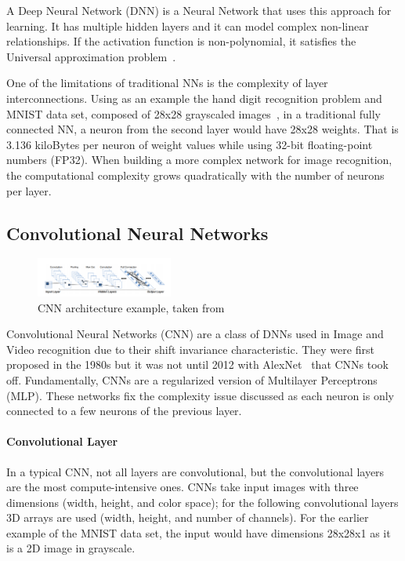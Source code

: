 \documentclass[conference]{IEEEtran}
\begin{document}
A Deep Neural Network (DNN) is a Neural Network that uses this approach for
learning. It has multiple hidden layers and it can model complex non-linear
relationships. If the activation function is non-polynomial, it satisfies the
Universal approximation problem~\cite{approximation:problem}.

One of the limitations of traditional NNs is the complexity of layer
interconnections. Using as an example the hand digit recognition problem and MNIST
data set, composed of 28x28 grayscaled images~\cite{mnist:digits}, in a
traditional fully connected NN, a neuron from the second layer would have 28x28
weights. That is 3.136 kiloBytes per neuron of weight values while using 32-bit
floating-point numbers (FP32). When building a more complex network for image
recognition, the computational complexity grows quadratically with the number
of neurons per layer.


\subsection{Convolutional Neural Networks}
\label{section:cnn}

 \begin{figure}[!htb]
    \centering
    \includegraphics[width=0.4\textwidth]{Figures/convolutionlayer.png}
    \caption{CNN architecture example, taken from~\cite{cgracnn}}
    \label{CNNl}
\end{figure} 

Convolutional Neural Networks (CNN) are a class of DNNs used in Image and Video
recognition due to their shift invariance characteristic. They were first
proposed in the 1980s but it was not until 2012 with AlexNet~\cite{alexnet} that
CNNs took off. Fundamentally, CNNs are a regularized version of
Multilayer Perceptrons (MLP). These networks fix the complexity issue discussed
as each neuron is only connected to a few neurons of the previous layer.


\paragraph{Convolutional Layer}
\label{section:convlayer}

In a typical CNN, not all layers are convolutional, but the convolutional layers
are the most compute-intensive ones. CNNs take input images with three  dimensions
(width, height, and color space); for the following convolutional layers 3D
arrays are used (width, height, and number of channels). For the earlier example
of the MNIST data set, the input would have dimensions 28x28x1 as it is a 2D
image in grayscale.
\end{document}
